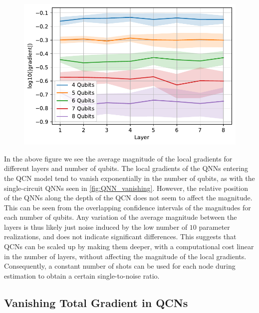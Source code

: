 \begin{figure}[H]
    \centering
    \includegraphics[width=12cm]{latex/figures/vanishing_gradient_partial_input.pdf}
    \caption{}
    \label{fig:QCN_local_vanishing}
\end{figure}

In the above figure we see the average magnitude of the local gradients for different layers and number of qubits. The local gradients of the QNNs entering the QCN model tend to vanish exponentially in the number of qubits, as with the single-circuit QNNs seen in \autoref{fig:QNN_vanishing}. However, the relative position of the QNNs along the depth of the QCN does not seem to affect the magnitude. This can be seen from the overlapping confidence intervals of the magnitudes for each number of qubits. Any variation of the average magnitude between the layers is thus likely just noise induced by the low number of $10$ parameter realizations, and does not indicate significant differences. This suggests that QCNs can be scaled up by making them deeper, with a computational cost linear in the number of layers, without affecting the magnitude of the local gradients. Consequently, a constant number of shots can be used for each node during estimation to obtain a certain single-to-noise ratio. 

\subsection{Vanishing Total Gradient in QCNs}\label{sec:Vanishing Total Gradients in QCNs}

